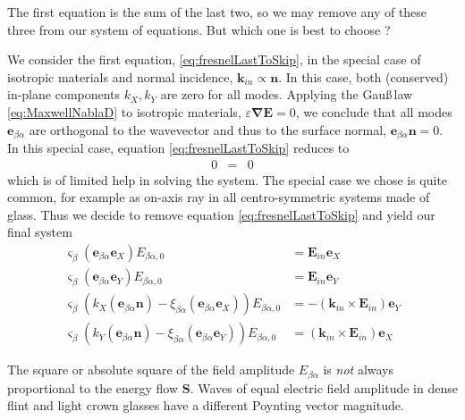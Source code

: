 \documentclass[12pt,a4paper,twoside,openright,BCOR10mm,headsepline,titlepage,abstracton,chapterprefix,final]{scrreprt}
\newcommand\Vector[1]{{\mathbf{#1}}}
\newcommand\wavenumber{k}
\newcommand\Wavevector{\Vector{\wavenumber}}
\newcommand\Nabla{\Vector{\nabla}}
\newcommand\scalarEfield{E}
\newcommand\Efield{\Vector{\scalarEfield}}
\newcommand\scalarpermittivity{\varepsilon}
\begin{document}
The first equation is the sum of the last two, so we may remove any of these three from our system of equations.
But which one is best to choose ?

We consider the first equation, \eqref{eq:fresnelLastToSkip}, in the special case of isotropic materials and normal incidence,
$\Wavevector_{in} \propto \Vector{n}$.
In this case, both (conserved) in-plane components $\wavenumber_X, \wavenumber_Y$ are zero for all modes.
Applying the Gau\ss\,law \eqref{eq:MaxwellNablaD} to isotropic materials, $\scalarpermittivity \Nabla \Efield = 0$, we conclude that 
all modes $\Vector{e}_{\beta\alpha}$ are orthogonal to the wavevector and thus to the surface normal,
$\Vector{e}_{\beta\alpha} \Vector{n} = 0$.
In this special case, equation \eqref{eq:fresnelLastToSkip} reduces to
\begin{eqnarray*}
 0 &=& 0
\end{eqnarray*}
which is of limited help in solving the system. 
The special case we chose is quite common, for example as on-axis ray in all centro-symmetric systems made of glass.
Thus we decide to remove equation \eqref{eq:fresnelLastToSkip} and yield our final system
\begin{subequations} \label{eq:fresnel_equation_system_general}
  \begin{align}
    \varsigma_\beta (\Vector{e}_{\beta\alpha} \Vector{e}_X) E_{\beta\alpha,0} &= \Efield_{in} \Vector{e}_X \\
    \varsigma_\beta (\Vector{e}_{\beta\alpha} \Vector{e}_Y) E_{\beta\alpha,0} &= \Efield_{in} \Vector{e}_Y \\
    \varsigma_\beta \left( \wavenumber_X ( \Vector{e}_{\beta\alpha} \Vector{n} )  - \xi_{\beta\alpha} ( \Vector{e}_{\beta\alpha} \Vector{e}_X) \right) E_{\beta\alpha,0} &= -(\Wavevector_{in} \times \Efield_{in}) \Vector{e}_Y \\
    \varsigma_\beta \left( \wavenumber_Y ( \Vector{e}_{\beta\alpha} \Vector{n} )  - \xi_{\beta\alpha} ( \Vector{e}_{\beta\alpha} \Vector{e}_Y) \right) E_{\beta\alpha,0} &= (\Wavevector_{in} \times \Efield_{in}) \Vector{e}_X 
  \end{align} 
\end{subequations}

The square or absolute square of the field amplitude $E_{\beta\alpha}$ 
is \emph{not} always proportional to the energy flow $\Vector{S}$.
Waves of equal electric field amplitude in dense flint and light crown glasses have a different Poynting vector magnitude.
\end{document}
